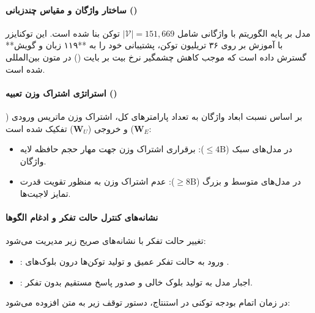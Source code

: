 \item {}

\paragraph*{ساختار واژگان و مقیاس چندزبانی ()}
مدل  \cite{qwen2025qwen3} بر پایه الگوریتم  با واژگانی شامل $|\mathcal{V}| = 151{,}669$ توکن بنا شده است. این توکنایزر با آموزش بر روی ۳۶ تریلیون توکن، پشتیبانی خود را به **۱۱۹ زبان و گویش** گسترش داده است که موجب کاهش چشمگیر نرخ بیت بر بایت () در متون بین‌المللی شده است.

\paragraph*{استراتژی اشتراک وزن تعبیه ()}
بر اساس نسبت ابعاد واژگان به تعداد پارامترهای کل، اشتراک وزن ماتریس ورودی ($\mathbf{W}_E$) و خروجی ($\mathbf{W}_U$) تفکیک شده است:
\begin{itemize}
    \item در مدل‌های سبک ($\le 4\text{B}$): برقراری اشتراک وزن جهت مهار حجم حافظه لایه واژگان.
    \item در مدل‌های متوسط و بزرگ ($\ge 8\text{B}$): عدم اشتراک وزن به منظور تقویت قدرت تمایز لاجیت‌ها.
\end{itemize}

\paragraph*{نشانه‌های کنترل حالت تفکر و ادغام الگوها}
تغییر حالت تفکر با نشانه‌های صریح زیر مدیریت می‌شود:
\begin{itemize}
    \item {}: ورود به حالت تفکر عمیق و تولید توکن‌ها درون بلوک‌های .
    \item {}: اجبار مدل به تولید بلوک خالی  و صدور پاسخ مستقیم بدون تفکر.
\end{itemize}
در زمان اتمام بودجه توکنی در استنتاج، دستور توقف زیر به متن افزوده می‌شود:
\begin{center}
\small
{}
\end{center}
